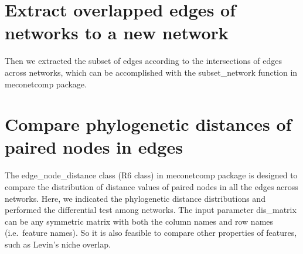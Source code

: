 \documentclass[
]{book}
\newenvironment{Shaded}{\begin{snugshade}}{\end{snugshade}}
\newcommand{\AttributeTok}[1]{\textcolor[rgb]{0.13,0.29,0.53}{#1}}
\newcommand{\CommentTok}[1]{\textcolor[rgb]{0.56,0.35,0.01}{\textit{#1}}}
\newcommand{\FunctionTok}[1]{\textcolor[rgb]{0.13,0.29,0.53}{\textbf{#1}}}
\newcommand{\NormalTok}[1]{#1}
\newcommand{\OtherTok}[1]{\textcolor[rgb]{0.56,0.35,0.01}{#1}}
\newcommand{\SpecialCharTok}[1]{\textcolor[rgb]{0.81,0.36,0.00}{\textbf{#1}}}
\newcommand{\StringTok}[1]{\textcolor[rgb]{0.31,0.60,0.02}{#1}}
\begin{document}
\section{Extract overlapped edges of networks to a new network}\label{extract-overlapped-edges-of-networks-to-a-new-network}

Then we extracted the subset of edges according to the intersections of edges across networks,
which can be accomplished with the subset\_network function in meconetcomp package.

\begin{Shaded}
\end{Shaded}

\section{Compare phylogenetic distances of paired nodes in edges}\label{compare-phylogenetic-distances-of-paired-nodes-in-edges}

The edge\_node\_distance class (R6 class) in meconetcomp package is designed to compare the distribution of distance values of paired nodes in all the edges across networks.
Here, we indicated the phylogenetic distance distributions and performed the differential test among networks.
The input parameter dis\_matrix can be any symmetric matrix with both the column names and row names (i.e.~feature names).
So it is also feasible to compare other properties of features, such as Levin's niche overlap.
\end{document}
